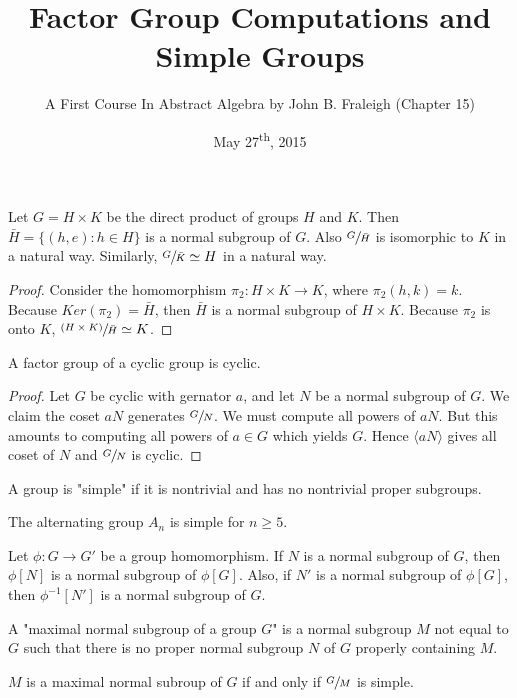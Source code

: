 \documentclass[a4paper,8]{article}
\title{Factor Group Computations and Simple Groups}
\author{A First Course In Abstract Algebra by John B. Fraleigh (Chapter 15)}
\date{May 27\textsuperscript{th}, 2015}
\begin{document}
\maketitle
{}

\begin{outline}

    Let \(G = H \times K\) be the direct product of groups \(H\) and \(K\). Then \(\bar{H} = \{(h, e) : h \in H\}\)
    is a normal subgroup of \(G\). Also \(\sfrac{G}{\bar{H}}\) is isomorphic to \(K\) in a natural way. Similarly,
    \(\sfrac{G}{\bar{K}} \simeq H\) in a natural way.

    \begin{proof}
      Consider the homomorphism \(\pi_{2}: H \times K \rightarrow K\), where \(\pi_{2}(h, k) = k\). Because
      \(Ker(\pi_{2}) = \bar{H}\), then \(\bar{H}\) is a normal subgroup of \(H \times K\). Because
      \(\pi_{2}\) is onto \(K\), \(\sfrac{(H \times K)}{\bar{H}} \simeq K\).
    \end{proof}

    A factor group of a cyclic group is cyclic.

    \begin{proof}
      Let \(G\) be cyclic with gernator \(a\), and let \(N\) be a normal subgroup of \(G\). We claim the coset \(aN\)
      generates \(\sfrac{G}{N}\). We must compute all powers of \(aN\). But this amounts to computing all powers of
      \(a \in G\) which yields \(G\). Hence \(\langle aN \rangle\) gives all coset of \(N\) and \(\sfrac{G}{N}\) is cyclic.
    \end{proof}

    A group is "simple" if it is nontrivial and has no nontrivial proper subgroups.

    The alternating group \(A_{n}\) is simple for \(n \geq 5\).

    Let \(\phi: G \rightarrow G'\) be a group homomorphism. If \(N\) is a normal subgroup of \(G\), then
    \(\phi[N]\) is a normal subgroup of \(\phi[G]\). Also, if \(N'\) is a normal subgroup of \(\phi[G]\),
    then \(\phi^{-1}[N']\) is a normal subgroup of \(G\).

    A "maximal normal subgroup of a group \(G\)" is a normal subgroup \(M\) not equal to \(G\) such that
    there is no proper normal subgroup \(N\) of \(G\) properly containing \(M\).

    \(M\) is a maximal normal subroup of \(G\) if and only if \(\sfrac{G}{M}\) is simple.


\end{outline}
\end{document}

